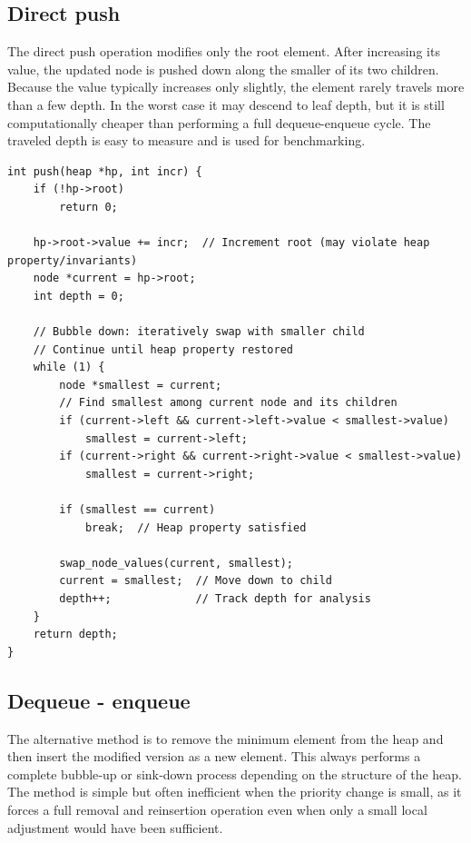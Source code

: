 \documentclass[a4paper,11pt]{article}
\begin{document}
\subsection*{Direct push}

The direct push operation modifies only the root element. After increasing its value, the updated node is pushed down along the smaller of its two children. Because the value typically increases only slightly, the element rarely travels more than a few depth. In the worst case it may descend to leaf depth, but it is still computationally cheaper than performing a full dequeue-enqueue cycle. The traveled depth is easy to measure and is used for benchmarking.


\begin{verbatim}
int push(heap *hp, int incr) {
    if (!hp->root)
        return 0;

    hp->root->value += incr;  // Increment root (may violate heap property/invariants)
    node *current = hp->root;
    int depth = 0;
    
    // Bubble down: iteratively swap with smaller child
    // Continue until heap property restored
    while (1) {
        node *smallest = current;
        // Find smallest among current node and its children
        if (current->left && current->left->value < smallest->value)
            smallest = current->left;
        if (current->right && current->right->value < smallest->value)
            smallest = current->right;
        
        if (smallest == current)
            break;  // Heap property satisfied
        
        swap_node_values(current, smallest);
        current = smallest;  // Move down to child
        depth++;             // Track depth for analysis
    }
    return depth;
}
\end{verbatim}

\subsection*{Dequeue - enqueue}

The alternative method is to remove the minimum element from the heap and then insert the modified version as a new element. This always performs a complete bubble‑up or sink‑down process depending on the structure of the heap. The method is simple but often inefficient when the priority change is small, as it forces a full removal and reinsertion operation even when only a small local adjustment would have been sufficient.
\end{document}
